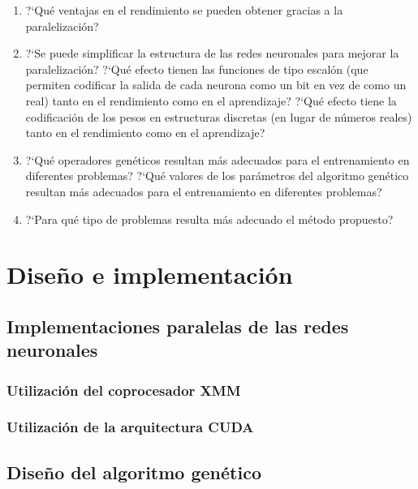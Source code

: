 \documentclass[a4paper,11pt]{article}
\begin{document}
\begin{enumerate}
 
 \item  ?`Qu\'e ventajas en el rendimiento se pueden obtener gracias a la paralelizaci\'on?

 \item  ?`Se puede simplificar la estructura de las redes neuronales para mejorar la paralelizaci\'on? ?`Qu\'e efecto tienen las funciones de tipo escal\'on (que permiten codificar la salida de cada neurona como un bit en vez de como un real) tanto en el rendimiento como en el aprendizaje? ?`Qu\'e efecto tiene la codificaci\'on de los pesos en estructuras discretas (en lugar de n\'umeros reales) tanto en el rendimiento como en el aprendizaje?

 \item  ?`Qu\'e operadores gen\'eticos resultan m\'as adecuados para el entrenamiento en diferentes problemas? ?`Qu\'e valores de los par\'ametros del algoritmo gen\'etico resultan m\'as adecuados para el entrenamiento en diferentes problemas?

 \item  ?`Para qu\'e tipo de problemas resulta m\'as adecuado el m\'etodo propuesto? 

\end{enumerate}


\section{Dise\~no e implementaci\'on}\label{diseno}
	\subsection{ Implementaciones paralelas de las redes neuronales}\label{disenoParal}
		\subsubsection{Utilizaci\'on del coprocesador XMM}\label{disenoParalXMM}
		\subsubsection{Utilizaci\'on de la arquitectura CUDA}\label{disenoParalCUDA}
	\subsection{ Dise\~no del algoritmo gen\'etico}\label{disenoGene}
\end{document}
